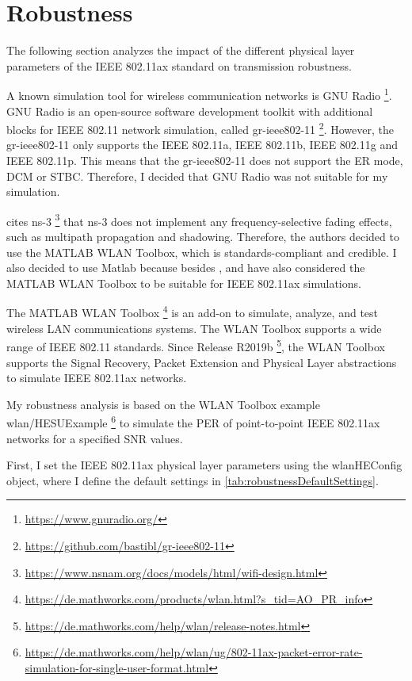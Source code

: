 \section{Robustness}
\label{sec:Robustness}
The following section analyzes the impact of the different physical layer parameters of the IEEE 802.11ax standard on transmission robustness.

A known simulation tool for wireless communication networks is GNU Radio \footnote{\url{https://www.gnuradio.org/}}.
GNU Radio is an open-source software development toolkit with additional blocks for IEEE 802.11 network simulation,
called gr-ieee802-11 \footnote{\url{https://github.com/bastibl/gr-ieee802-11}}.
However, the gr-ieee802-11 only supports the IEEE 802.11a, IEEE 802.11b, IEEE 802.11g and IEEE 802.11p.
This means that the gr-ieee802-11 does not support the \ac{ER} mode, \ac{DCM} or \ac{STBC}.
Therefore, I decided that GNU Radio was not suitable for my simulation.

\textcite{s_performance_2022} cites ns-3 \footnote{\url{https://www.nsnam.org/docs/models/html/wifi-design.html}}
that ns-3 does not implement
any frequency-selective fading effects, such as multipath propagation and shadowing.
Therefore, the authors decided to use the MATLAB WLAN Toolbox, which is standards-compliant and credible.
I also decided to use Matlab because besides \cite{s_performance_2022}, \cite{cao_efficient_2022} and
\cite{jin_efficient_2021} have also considered
the MATLAB WLAN Toolbox to be suitable for IEEE 802.11ax simulations.

The MATLAB WLAN Toolbox \footnote{\url{https://de.mathworks.com/products/wlan.html?s_tid=AO_PR_info}} is an add-on to simulate, analyze, and test wireless LAN communications systems.
The WLAN Toolbox supports a wide range of IEEE 802.11 standards.
Since Release R2019b \footnote{\url{https://de.mathworks.com/help/wlan/release-notes.html}}, the WLAN Toolbox supports the Signal Recovery, Packet Extension and Physical Layer abstractions to simulate IEEE 802.11ax networks.

My robustness analysis is based on the WLAN Toolbox example wlan/HESUExample \footnote{\url{https://de.mathworks.com/help/wlan/ug/802-11ax-packet-error-rate-simulation-for-single-user-format.html}} to simulate the \ac{PER} of point-to-point IEEE 802.11ax networks for
a specified \ac{SNR} values.

First, I set the IEEE 802.11ax physical layer parameters using the wlanHEConfig object,
where I define the default settings in \autoref{tab:robustnessDefaultSettings}.


